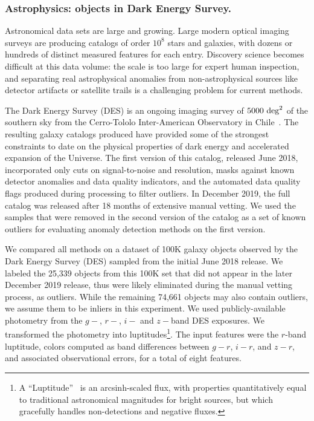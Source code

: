 \documentclass[letterpaper]{article} %
\begin{document}
\subsubsection{Astrophysics: objects in Dark Energy Survey.}
Astronomical data sets are large and growing. Large modern optical
imaging surveys are producing catalogs of order $10^8$ stars
and galaxies, with dozens or hundreds of distinct measured features
for each entry. Discovery science becomes difficult at this data
volume: the scale is too large for expert human inspection, and separating real
astrophysical anomalies from non-astrophysical sources like detector artifacts or
satellite trails is a challenging problem for current methods.

The Dark Energy Survey (DES) is an ongoing imaging survey of
$5000~{\rm deg}^2$ of the southern sky from the Cerro-Tololo
Inter-American Observatory in Chile~\cite{zuntz2018dark}. The resulting galaxy catalogs produced have provided some of the strongest constraints to date on
the physical properties of dark energy and accelerated expansion
of the Universe. The first version of this catalog, released June 2018, incorporated
only cuts on signal-to-noise and resolution, masks against known detector
anomalies and data quality indicators, and the automated data quality
flags produced during processing to filter outliers. 
In December 2019, the full catalog
was released after 18 months of extensive manual vetting. We used the samples 
that were removed in the second version of the catalog as a set of known
outliers for evaluating anomaly detection methods on the first version.

We compared all methods on a dataset of 100K galaxy objects
observed by the Dark Energy Survey (DES) sampled from the initial June 2018 release.
We labeled the 25,339 objects from this 100K set that did not appear in the later December 2019
release, thus were likely eliminated during the manual vetting process, 
as outliers.
While the remaining 74,661 objects may also contain outliers, we assume them to be inliers in this experiment. We used publicly-available photometry from the $g-$, $r-$, $i-$ and $z-$band DES exposures.  We
transformed the photometry into luptitudes\footnote{A
  ``Luptitude''~\cite{lupton99} is an arcsinh-scaled flux, with
  properties quantitatively equal to
  traditional astronomical magnitudes for bright sources, but which
  gracefully handles non-detections and negative fluxes.}.  The input features 
  were the $r$-band luptitude, colors computed as band differences between
$g-r$, $i-r$, and $z-r$, and associated observational errors, for a total of eight features.
%
\end{document}
